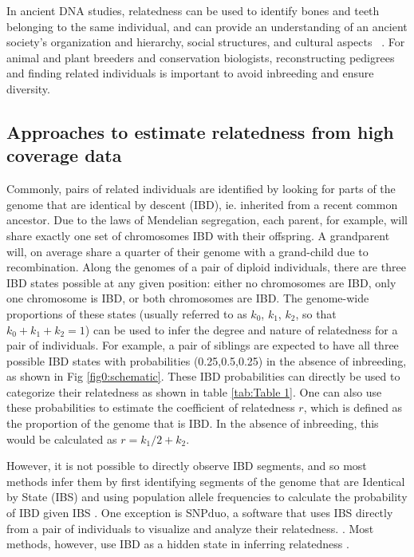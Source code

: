 \documentclass[12pt, letterpaper]{article}
\begin{document}
In ancient DNA studies, relatedness can be used to identify bones and teeth belonging to the same individual, and can provide an understanding of an ancient society's organization and hierarchy, social structures, and cultural aspects ~\cite{baca_ancient_2012,mittnik_KINship-based_2019,sikora_ancient_2017}. For animal and plant breeders and conservation biologists, reconstructing pedigrees and finding related individuals is important to avoid inbreeding and ensure diversity. ~\cite{habier_impact_2007,oliehoek_estimating_2006,kardos_measuring_2015} 


\subsection{Approaches to estimate relatedness from high coverage data}

Commonly, pairs of related individuals are identified by looking for parts of the genome that are identical by descent (IBD), ie. inherited from a recent common ancestor. Due to the laws of Mendelian segregation, each parent, for example, will share exactly one set of chromosomes IBD with their offspring. A grandparent will, on average share a quarter of their genome with a grand-child due to recombination. Along the genomes of a pair of diploid individuals, there are three IBD states possible at any given position: either no chromosomes are IBD, only one chromosome is IBD, or both chromosomes are IBD. The genome-wide proportions of these states (usually referred to as $k_0$, $k_1$, $k_2$, so that $k_0+k_1+k_2=1$) can be used to infer the degree and nature of relatedness for a pair of individuals. For example, a pair of siblings are expected to have all three possible IBD states with probabilities (0.25,0.5,0.25) in the absence of inbreeding, as shown in Fig \ref{fig0:schematic}. These IBD probabilities can directly be used to categorize their relatedness as shown in table \ref{tab:Table 1}. One can also use these probabilities to estimate the coefficient of relatedness $r$, which is defined as the proportion of the genome that is IBD. In the absence of inbreeding, this would be calculated as $r= k_1/2 + k_2$.

However, it is not possible to directly observe IBD segments, and so most methods infer them by first identifying segments of the genome that are Identical by State (IBS) and using population allele frequencies to calculate the probability of IBD given IBS \cite{vai_KINship_2020}. One exception is SNPduo, a software that uses IBS directly from a pair of individuals to visualize and analyze their relatedness. \cite{roberson_visualization_2009}. Most methods, however, use IBD as a hidden state in inferring relatedness \cite{boehnke_accurate_1997,lynch_estimation_1999, albrechtsen_natural_2010, purcell_plink_2007}.
\end{document}
